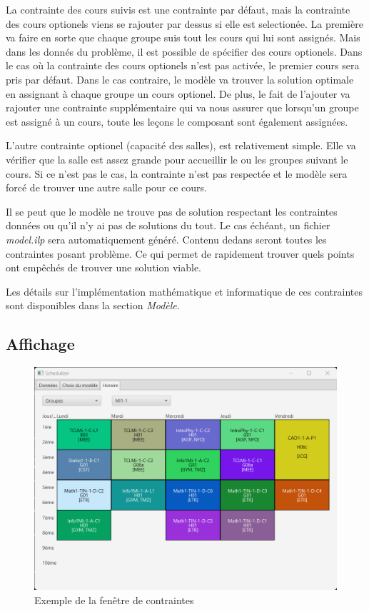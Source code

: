 La contrainte des cours suivis est une contrainte par défaut, mais la contrainte des cours optionels viens se rajouter par dessus si elle est selectionée. La première va faire en sorte que chaque groupe suis tout les cours qui lui sont assignés. Mais dans les donnés du problème, il est possible de spécifier des cours optionels. Dans le cas où la contrainte des cours optionels n'est pas activée, le premier cours sera pris par défaut. Dans le cas contraire, le modèle va trouver la solution optimale en assignant à chaque groupe un cours optionel. De plus, le fait de l'ajouter va rajouter une contrainte supplémentaire qui va nous assurer que lorsqu'un groupe est assigné à un cours, toute les leçons le composant sont également assignées.

L'autre contrainte optionel (capacité des salles), est relativement simple. Elle va vérifier que la salle est assez grande pour accueillir le ou les groupes suivant le cours. Si ce n'est pas le cas, la contrainte n'est pas respectée et le modèle sera forcé de trouver une autre salle pour ce cours.

Il se peut que le modèle ne trouve pas de solution respectant les contraintes données ou qu'il n'y ai pas de solutions du tout. Le cas échéant, un fichier \textit{model.ilp} sera automatiquement généré. Contenu dedans seront toutes les contraintes posant problème. Ce qui permet de rapidement trouver quels points ont empêchés de trouver une solution viable.

Les détails sur l'implémentation mathématique et informatique de ces contraintes sont disponibles dans la section \textit{Modèle}.

\subsection{Affichage}

\begin{figure}[H]
    \centering
    \includegraphics[width=1\textwidth]{./assets/figures/scheduleWindow.png}
    \caption{Exemple de la fenêtre de contraintes}
\end{figure}

